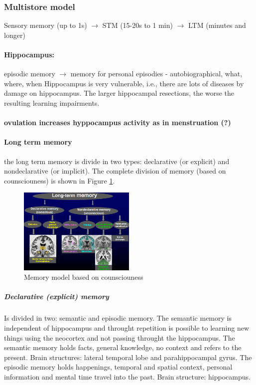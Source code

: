\documentclass[12pt,article,oneside,a4paper]{memoir}
\begin{document}
\subsubsection{Multistore model}
Sensory memory (up to 1s) $\rightarrow$ STM (15-20s to 1 min) $\rightarrow$ LTM (minutes and longer)
\paragraph{Hippocampus:} episodic memory $\rightarrow$ memory for personal episodies - autobiographical, what, where, when
Hippocampus is very vulnerable, i.e., there are lots of diseases by damage on hippocampus. The larger hippocampal resections, the worse the resulting learning impairments.
\paragraph{ovulation increases hyppocampus activity as in menstruation (?)}

\paragraph{Long term memory} the long term memory is divide in two types: declarative (or explicit) and nondeclarative (or implicit). The complete division of memory (based on counsciouness) is shown in Figure \ref{fig:old-memory-model}.

\begin{figure}[h]
  \centering
  \includegraphics[width=0.5\textwidth]{imgs/old-memory-model.png}
  \caption{Memory model based on counsciouness}
  \label{fig:old-memory-model}
\end{figure}

\subparagraph{Declarative (explicit) memory }
Is divided in two: semantic and episodic memory. The semantic memory is independent of hippocampus and throught repetition is possible to learning new things using the neocortex and not passing throught the hippocampus. The semantic memory holds facts, general knowledge, no context and refers to the present. Brain structures: lateral temporal lobe and parahippocampal gyrus. The episodic memory holds happenings, temporal and spatial context, personal information and mental time travel into the past. Brain structure: hippocampus.
\end{document}
